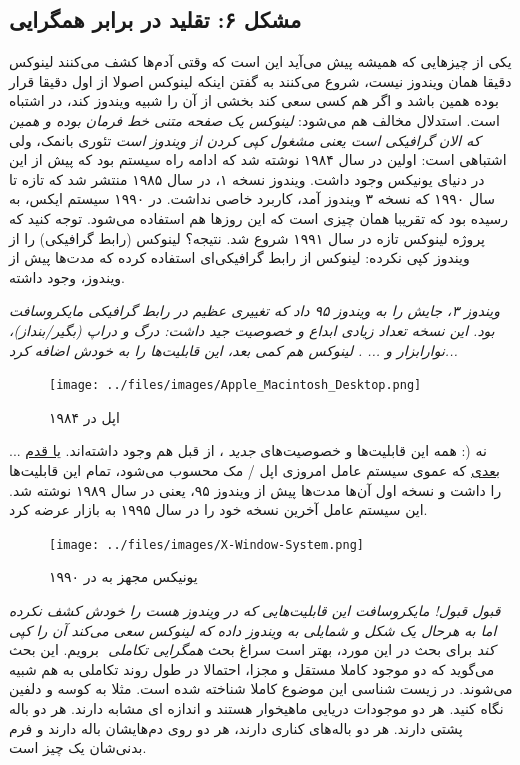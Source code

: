 \subsection*{مشکل ۶: تقلید در برابر همگرایی}
یکی از چیزهایی که همیشه پیش می‌آید این است که وقتی آدم‌ها کشف می‌کنند لینوکس دقیقا همان ویندوز نیست، شروع می‌کنند به گفتن اینکه لینوکس اصولا از اول دقیقا قرار بوده همین باشد و اگر هم کسی سعی کند بخشی از آن را شبیه ویندوز کند، در اشتباه است. استدلال مخالف هم می‌شود:
\emph{لینوکس یک صفحه متنی خط فرمان بوده و همین که الان گرافیکی است یعنی مشغول کپی کردن از ویندوز است}
تئوری بانمک، ولی اشتباهی است: اولین 
 در سال ۱۹۸۴ نوشته شد که ادامه راه سیستم 
 بود که پیش از این در دنیای یونیکس وجود داشت. ویندوز نسخه ۱، در سال ۱۹۸۵ منتشر شد که تازه تا سال ۱۹۹۰ که نسخه ۳ ویندوز آمد، کاربرد خاصی نداشت. در ۱۹۹۰ سیستم ایکس،‌ به 
 رسیده بود که تقریبا همان چیزی است که این روزها هم استفاده می‌شود. توجه کنید که پروژه لینوکس تازه در سال ۱۹۹۱ شروع شد. نتیجه؟ لینوکس 
 (رابط گرافیکی) را از ویندوز کپی نکرده: لینوکس از رابط گرافیکی‌ای استفاده کرده که مدت‌ها پیش از ویندوز، وجود داشته.

\emph{ویندوز ۳، جایش را به ویندوز ۹۵ داد که تغییری عظیم در رابط گرافیکی مایکروسافت بود. این نسخه تعداد زیادی ابداع و خصوصیت جید داشت:‌ درگ و دراپ (بگیر/بنداز)، نوارابزار و ... . لینوکس هم کمی بعد، این قابلیت‌ها را به خودش اضافه کرد...}
\begin{figure}[h]
\texttt{[image: ../files/images/Apple\_Macintosh\_Desktop.png]}
\caption*{اپل در ۱۹۸۴}
\end{figure}


... نه (: همه این قابلیت‌ها و خصوصیت‌های
\emph{جدید}
، از قبل هم وجود داشته‌اند.
\href{http://en.wikipedia.org/wiki/NeXTSTEP}{ یا قدم بعدی}
که عموی سیستم عامل امروزی اپل / مک محسوب می‌شود‌، تمام این قابلیت‌ها را داشت و نسخه اول آن‌ها مدت‌ها پیش از ویندوز ۹۵، یعنی در سال ۱۹۸۹ نوشته شد. این سیستم عامل آخرین نسخه خود را در سال ۱۹۹۵ به بازار عرضه کرد.
\begin{figure}[h]
	\texttt{[image: ../files/images/X-Window-System.png]}
	\caption*{یونیکس مجهز به 
		در ۱۹۹۰}
\end{figure}
\emph{قبول قبول! مایکروسافت این قابلیت‌هایی که در ویندوز هست را خودش کشف نکرده اما به هرحال یک شکل و شمایلی به ویندوز داده که لینوکس سعی می‌کند آن را کپی کند}
برای بحث در این مورد، بهتر است سراغ بحث
\emph{همگرایی تکاملی}
‌ برویم. این بحث می‌گوید که دو موجود کاملا مستقل و مجزا، احتمالا در طول روند تکاملی به هم شبیه می‌شوند. در زیست شناسی این موضوع کاملا شناخته شده است. مثلا به کوسه و دلفین نگاه کنید. هر دو موجودات دریایی ماهیخوار هستند و اندازه ای مشابه دارند. هر دو باله پشتی دارند. هر دو باله‌های کناری دارند، هر دو روی دم‌هایشان باله دارند و فرم بدنی‌شان یک چیز است.

